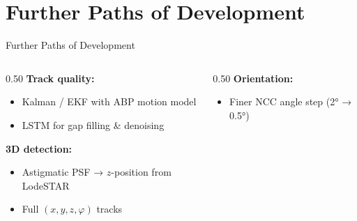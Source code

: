 
\section[Further Development]{Further Paths of Development}

\begin{frame}{Further Paths of Development}
\begin{columns}
\begin{column}{0.50\textwidth}
\textbf{Track quality:}
\begin{itemize}
    \item Kalman / EKF with ABP motion model
    \item LSTM for gap filling \& denoising
\end{itemize}
\vspace{0.4cm}
\textbf{3D detection:}
\begin{itemize}
    \item Astigmatic PSF → $z$-position from LodeSTAR
    \item Full $(x, y, z, \varphi)$ tracks
\end{itemize}
\end{column}
\begin{column}{0.50\textwidth}
\textbf{Orientation:}
\begin{itemize}
    \item Finer NCC angle step (2° → 0.5°)
\end{itemize}
\vspace{0.4cm}
\end{column}
\end{columns}
\end{frame}
